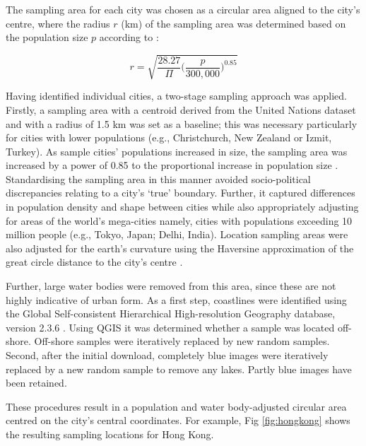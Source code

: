 \documentclass[10pt,letterpaper]{article}
\begin{document}
The sampling area for each city was chosen as a circular area aligned to the city's centre, where the radius $r$ (km) of the sampling area was determined based on the population size $p$ according to \cite{Barthelemy2016}: %

\begin{equation}
r = \sqrt{ \frac{28.27}{\Pi} \bigg( \frac{p}{300,000}  \bigg)^{0.85} }
\end{equation}

Having identified individual cities, a two-stage sampling approach was applied. Firstly, a sampling area with a centroid derived from the United Nations dataset and with a radius of 1.5 km was set as a baseline; this was necessary particularly for cities with lower populations (e.g., Christchurch, New Zealand or Izmit, Turkey). As sample cities' populations increased in size, the sampling area was increased by a power of 0.85 to the proportional increase in population size \cite{Barthelemy2016}. Standardising the sampling area in this manner avoided socio-political discrepancies relating to a city's `true' boundary. Further, it captured differences in population density and shape between cities while also appropriately adjusting for areas of the world's mega-cities namely, cities with populations exceeding 10 million people (e.g., Tokyo, Japan;  Delhi, India). Location sampling areas were also adjusted for the earth's curvature using the Haversine approximation of the great circle distance to the city's centre \cite{Sinnott1984}. 

Further, large water bodies were removed from this area, since these are not highly indicative of urban form. As a first step, coastlines were identified using the Global Self-consistent Hierarchical High-resolution Geography database, version 2.3.6 \cite{Wessel1996}. Using QGIS \cite{QGIS2009} it was determined whether a sample was located off-shore. Off-shore samples were iteratively replaced by new random samples. Second, after the initial download, completely blue images were iteratively replaced by a new random sample to remove any lakes. Partly blue images have been retained.

These procedures result in a population and water body-adjusted circular area centred on the city's central coordinates. For example, Fig \ref{fig:hongkong}  shows the resulting sampling locations for Hong Kong.
\end{document}
